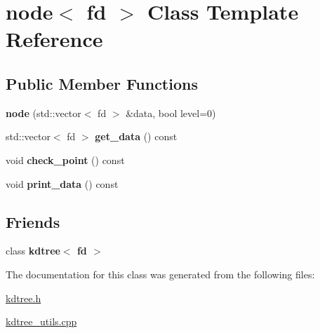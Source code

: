 \hypertarget{classnode}{}\section{node$<$ fd $>$ Class Template Reference}
\label{classnode}
\subsection*{Public Member Functions}
\begin{DoxyCompactItemize}
\item 
\mbox{\label{classnode_abb2d5a39b7fcff742324019acaf42d2c}} 
{\bfseries node} (std\+::vector$<$ fd $>$ \&data, bool level=0)
\item 
\mbox{\label{classnode_ae9a1d7bf456930b81bba739af8c9044c}} 
std\+::vector$<$ fd $>$ {\bfseries get\+\_\+data} () const
\item 
\mbox{\label{classnode_a23e97fe46ab935948abbcd36f32cb50d}} 
void {\bfseries check\+\_\+point} () const
\item 
\mbox{\label{classnode_a7985a94a89f71279e7667354481c96f9}} 
void {\bfseries print\+\_\+data} () const
\end{DoxyCompactItemize}
\subsection*{Friends}
\begin{DoxyCompactItemize}
\item 
\mbox{\label{classnode_a01262b43303642d58dcf997f191757c8}} 
class {\bfseries kdtree$<$ fd $>$}
\end{DoxyCompactItemize}


The documentation for this class was generated from the following files\+:\begin{DoxyCompactItemize}
\item 
\hyperlink{kdtree_8h}{kdtree.\+h}\item 
\hyperlink{kdtree__utils_8cpp}{kdtree\+\_\+utils.\+cpp}\end{DoxyCompactItemize}
